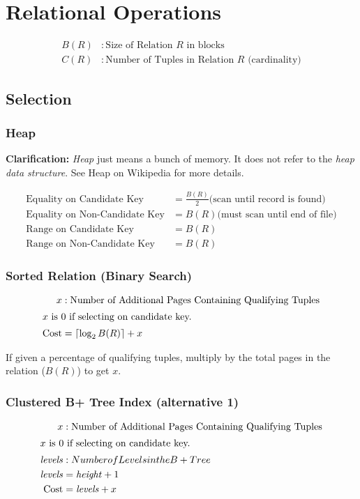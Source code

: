 \documentclass{article}
\newcommand{\ceil}[1]{\left\lceil#1\right\rceil}
\begin{document}
\section{Relational Operations}

\begin{align*}
  B(R) &: \text{Size of Relation \(R\) in blocks} \\
  C(R) &: \text{Number of Tuples in Relation \(R\) (cardinality)}
\end{align*}

\subsection{Selection}

\subsubsection{Heap}

\textbf{Clarification:} \textit{Heap} just means a bunch of memory. It
does not refer to the \textit{heap data structure}. See Heap on Wikipedia for
more details.

\begin{align}
  \text{Equality on Candidate Key} &= \frac{B(R)}{2} \text{(scan until record is found)} \\
  \text{Equality on Non-Candidate Key} &= B(R) \text{(must scan until end of file)} \\
  \text{Range on Candidate Key} &= B(R) \\
  \text{Range on Non-Candidate Key} &= B(R)
\end{align}

\subsubsection{Sorted Relation (Binary Search)}

\begin{align}
  x &: \text{Number of Additional Pages Containing Qualifying Tuples} \notag \\
  \intertext{\(x\) is 0 if selecting on candidate key.}
  \text{Cost} &= \ceil{\log_2B(R)} + x
\end{align}

If given a percentage of qualifying tuples, multiply by the total pages in the relation (\(B(R)\)) to get \(x\).

\subsubsection{Clustered B+ Tree Index (alternative 1)}

\begin{align}
  x &: \text{Number of Additional Pages Containing Qualifying Tuples} \notag \\
  \intertext{\(x\) is 0 if selecting on candidate key.}
  \mathit{levels} &: Number of Levels in the B+ Tree \\
  \mathit{levels} &= \mathit{height} + 1 \\
  \text{Cost} &= \mathit{levels} + x
\end{align}
\end{document}
